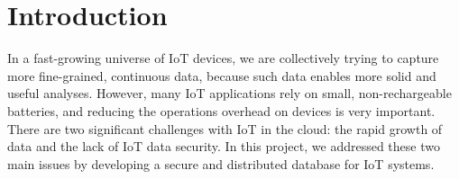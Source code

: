 
\section{Introduction}
\label{sec:Introduction}
In a fast-growing universe of IoT devices, we are collectively trying to capture more fine-grained, continuous data, because such data enables more solid and useful analyses. However, many IoT applications rely on small, non-rechargeable batteries, and reducing the operations overhead on devices is very important. There are two significant challenges with IoT in the cloud: the rapid growth of data and the lack of IoT data security. In this project, we addressed these two main issues by developing a secure and distributed database for IoT systems. 

